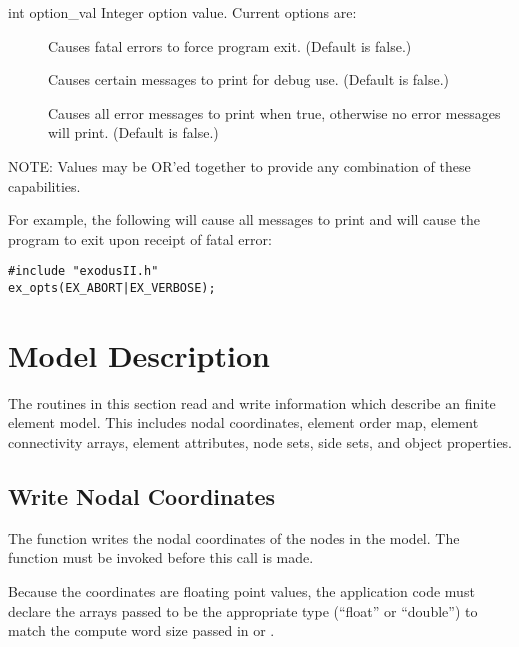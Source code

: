 \begin{parameters}
\item[{int option_val \R{}}]
Integer option value. Current options are:

\begin{description}
\item[] Causes fatal errors to force program 
exit. (Default is false.)

\item[] Causes certain messages to print 
for debug use. (Default is false.)

\item[] Causes all error messages to 
print when true, otherwise no error messages will print. (Default 
is false.)
\end{description}
\end{parameters}


NOTE: Values may be OR'ed together to provide any combination 
of these capabilities.

For example, the following will cause all messages to print 
and will cause the program to exit upon receipt of fatal error:

\begin{lstlisting}
#include "exodusII.h"
ex_opts(EX_ABORT|EX_VERBOSE);
\end{lstlisting}

\section{Model Description}

The routines in this section read and write information which 
describe an \exo{} finite element model. This includes nodal 
coordinates, element order map, element connectivity arrays, 
element attributes, node sets, side sets, and object properties.

\subsection{Write Nodal Coordinates}

The function  writes the nodal coordinates of
the nodes in the model. The function  must be
invoked before this call is made.

Because the coordinates are floating point values, the application
code must declare the arrays passed to be the appropriate type
(``float'' or ``double'') to match the compute word size passed
in  or .

